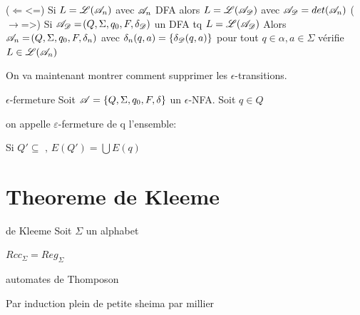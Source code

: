     \begin{nproof}
        ($\Leftarrow$<=) Si $L = \mathscr{L} \!\left(\mathscr{A}_n\right)$ avec $\mathscr{A}_n$ DFA alors $L = \mathscr{L} \!\left(\mathscr{A}_{\mathscr{D}}\right)$ avec $\mathscr{A}_{\mathscr{D}} = det \!\left(\mathscr{A}_n\right)$
        ($\rightarrow$=>) Si $\mathscr{A}_{\mathscr{D}} = \!\left(Q, \Sigma, q_0, F, \delta_{\mathscr{D}}\right)$ un DFA tq $L = \mathscr{L} \!\left(\mathscr{A}_{\mathscr{D}}\right)$
        Alors$\mathscr{A}_n = \!\left(Q, \Sigma, q_0, F, \delta_n\right)$ avec $\delta_n \!\left(q, a\right) = \left\{\delta_{\mathscr{D}} \!\left(q, a\right)\right\}$ pour tout $q \in \alpha, a \in \Sigma$ vérifie $L \in \mathscr{L} \!\left(\mathscr{A}_n\right)$
    \end{nproof}
    
    On va maintenant montrer comment supprimer les $\epsilon$-transitions.
    
    \begin{definition}{$\epsilon$-fermeture}{}
        Soit $\mathscr{A} = \left\{Q, \Sigma, q_0, F, \delta\right\}$ un $\epsilon$-NFA. 
        Soit $q\in Q $ %
        
        on appelle $\varepsilon$-fermeture de q l'ensemble: 
        
        
    \end{definition}
    \begin{notation}
        Si $Q' \subseteq \text{  , } E(Q') = \bigcup E(q) $ %
        
    \end{notation}
    
    
    \section{Theoreme de Kleeme}
    
    \begin{theorem}{de Kleeme}{}
    Soit $\Sigma$ un alphabet 
    
    
    $Rcc_\Sigma = Reg_\Sigma$
    
    \end{theorem}
    \begin{definition}{automates de Thomposon}{}
        
    \end{definition}
    
    \begin{nproof}{Par induction}
        plein de petite sheima par millier 
        
    \end{nproof}
    
